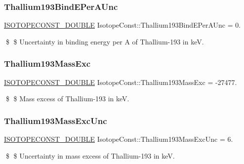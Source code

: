 \subsubsection{\texorpdfstring{Thallium193\+Bind\+E\+Per\+A\+Unc}{Thallium193BindEPerAUnc}}
{\footnotesize\ttfamily \mbox{\hyperlink{group___isotope_const-_macros_ga8f45a7272ce02c0b4c65c44636ed719a}{I\+S\+O\+T\+O\+P\+E\+C\+O\+N\+S\+T\+\_\+\+D\+O\+U\+B\+LE}} Isotope\+Const\+::\+Thallium193\+Bind\+E\+Per\+A\+Unc = 0.}

\$ \$ Uncertainty in binding energy per A of Thallium-\/193 in keV. \mbox{\label{group___isotope_const-_thallium-_tl193_ga2b9ce2a06f58307f7a40832e3df951a9}} 
\subsubsection{\texorpdfstring{Thallium193\+Mass\+Exc}{Thallium193MassExc}}
{\footnotesize\ttfamily \mbox{\hyperlink{group___isotope_const-_macros_ga8f45a7272ce02c0b4c65c44636ed719a}{I\+S\+O\+T\+O\+P\+E\+C\+O\+N\+S\+T\+\_\+\+D\+O\+U\+B\+LE}} Isotope\+Const\+::\+Thallium193\+Mass\+Exc = -\/27477.}

\$ \$ Mass excess of Thallium-\/193 in keV. \mbox{\label{group___isotope_const-_thallium-_tl193_gafb11d225dbb903a3abae2e638d4abfcc}} 
\subsubsection{\texorpdfstring{Thallium193\+Mass\+Exc\+Unc}{Thallium193MassExcUnc}}
{\footnotesize\ttfamily \mbox{\hyperlink{group___isotope_const-_macros_ga8f45a7272ce02c0b4c65c44636ed719a}{I\+S\+O\+T\+O\+P\+E\+C\+O\+N\+S\+T\+\_\+\+D\+O\+U\+B\+LE}} Isotope\+Const\+::\+Thallium193\+Mass\+Exc\+Unc = 6.}

\$ \$ Uncertainty in mass excess of Thallium-\/193 in keV. \mbox{\label{group___isotope_const-_thallium-_tl193_gaac469e314f617a8990f95e6007405b11}} 
